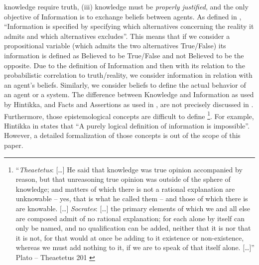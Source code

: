 \documentclass[conference]{IEEEtran}
\begin{document}
knowledge require truth, (iii) knowledge must be \emph{properly justified}, and
the only objective of Information is to exchange beliefs between agents.  As
defined in \autocite{Hintikka1993Information}, ``Information is specified by
specifying which alternatives concerning the reality it admits and which
alternatives excludes''. This means that if we consider a propositional
variable (which admits the two alternatives True/False) its information is
defined as Believed to be True/False and not Believed to be the opposite.  Due
to the definition of Information and then with its relation to the
probabilistic correlation to truth/reality, we consider information in relation
with an agent's beliefs. Similarly, we consider beliefs to define the actual
behavior of an agent or a system.
The difference between Knowledge and Information as used by Hintikka, and Facts
and Assertions as used in \autocite{Santaca2016abf}, are not precisely discussed
in \autocite{Santaca2016abf}.  Furthermore, those epistemological concepts are
difficult to define
\autocite{Gettier2012knowledge}\footnote{``\emph{Theaetetus}: [\ldots] He said
that knowledge was true opinion accompanied by reason, but that unreasoning
true opinion was outside of the sphere of knowledge; and matters of which there
is not a rational explanation are unknowable -- yes, that is what he called
them -- and those of which there is are knowable. [\ldots] \emph{Socrates}:
[\ldots] the primary elements of which we and all else are composed admit of no
rational explanation; for each alone by itself can only be named, and no
qualification can be added, neither that it is nor that it is not, for that
would at once be adding to it existence or non-existence, whereas we must add
nothing to it, if we are to speak of that itself alone.  [\ldots]'' Plato --
Theaetetus 201 \autocite{Plato1914Plato}}.  For example, Hintikka in
\autocite{Hintikka1993Information} states that ``A purely logical definition of
information is impossible''. However, a detailed formalization of those concepts is out
of the scope of this paper. 
\end{document}
